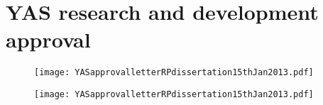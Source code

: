 
\chapter{YAS research and development approval}
\label{appendixc}

\begin{figure}[htbp]
\centerline{\texttt{[image: YASapprovalletterRPdissertation15thJan2013.pdf]}}
\label{yasrdform1}
\end{figure}

\newpage

\begin{figure}[htbp]
\centerline{\texttt{[image: YASapprovalletterRPdissertation15thJan2013.pdf]}}
\label{yasrdform2}
\end{figure}